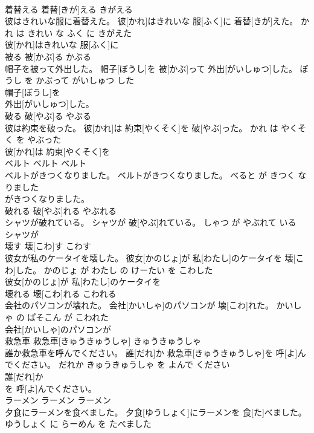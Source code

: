 \documentclass[8pt]{extreport}
\begin{document}
\begin{CJK}{UTF8}{min}
\\	着替える	着替[きが]える	きがえる	
\\	彼はきれいな服に着替えた。	彼[かれ]はきれいな 服[ふく]に 着替[きが]えた。	かれ は きれい な ふく に きがえた	
\\	彼[かれ]はきれいな 服[ふく]に
\\	被る	被[かぶ]る	かぶる	
\\	帽子を被って外出した。	帽子[ぼうし]を 被[かぶ]って 外出[がいしゅつ]した。	ぼうし を かぶって がいしゅつ した	
\\	帽子[ぼうし]を
\\	外出[がいしゅつ]した。			
\\	破る	破[やぶ]る	やぶる	
\\	彼は約束を破った。	彼[かれ]は 約束[やくそく]を 破[やぶ]った。	かれ は やくそく を やぶった	
\\	彼[かれ]は 約束[やくそく]を
\\	ベルト	ベルト	ベルト	
\\	ベルトがきつくなりました。	ベルトがきつくなりました。	べると が きつく なりました	
\\	がきつくなりました。			
\\	破れる	破[やぶ]れる	やぶれる	
\\	シャツが破れている。	シャツが 破[やぶ]れている。	しゃつ が やぶれて いる	
\\	シャツが
\\	壊す	壊[こわ]す	こわす	
\\	彼女が私のケータイを壊した。	彼女[かのじょ]が 私[わたし]のケータイを 壊[こわ]した。	かのじょ が わたし の けーたい を こわした	
\\	彼女[かのじょ]が 私[わたし]のケータイを
\\	壊れる	壊[こわ]れる	こわれる	
\\	会社のパソコンが壊れた。	会社[かいしゃ]のパソコンが 壊[こわ]れた。	かいしゃ の ぱそこん が こわれた	
\\	会社[かいしゃ]のパソコンが
\\	救急車	救急車[きゅうきゅうしゃ]	きゅうきゅうしゃ	
\\	誰か救急車を呼んでください。	誰[だれ]か 救急車[きゅうきゅうしゃ]を 呼[よ]んでください。	だれか きゅうきゅうしゃ を よんで ください	
\\	誰[だれ]か
\\	を 呼[よ]んでください。			
\\	ラーメン	ラーメン	ラーメン	
\\	夕食にラーメンを食べました。	夕食[ゆうしょく]にラーメンを 食[た]べました。	ゆうしょく に らーめん を たべました	

\end{CJK}
\end{document}
